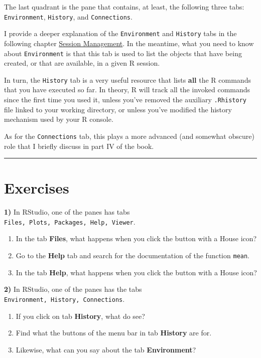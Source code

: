 \documentclass[
]{book}
\providecommand{\tightlist}{%
  \setlength{\itemsep}{0pt}\setlength{\parskip}{0pt}}
\begin{document}
The last quadrant is the pane that contains, at least, the following three
tabs: \texttt{Environment}, \texttt{History}, and \texttt{Connections}.

I provide a deeper explanation of the \texttt{Environment} and \texttt{History} tabs in the
following chapter \protect\hyperlink{session}{Session Management}. In the meantime, what you
need to know about \texttt{Environment} is that this tab is used to list the objects
that have being created, or that are available, in a given R session.

In turn, the \texttt{History} tab is a very useful resource that lists \textbf{all} the R
commands that you have executed so far. In theory, R will track all the invoked
commands since the first time you used it, unless you've removed the auxiliary
\texttt{.Rhistory} file linked to your working directory, or unless you've modified
the history mechanism used by your R console.

As for the \texttt{Connections} tab, this plays a more advanced (and somewhat obscure)
role that I briefly discuss in part IV of the book.

\begin{center}\rule{0.5\linewidth}{0.5pt}\end{center}

\hypertarget{exercises-1}{%
\section{Exercises}\label{exercises-1}}

\textbf{1)} In RStudio, one of the panes has tabs \texttt{Files,\ Plots,\ Packages,\ Help,\ Viewer}.

\begin{enumerate}
\def\labelenumi{\alph{enumi})}
\tightlist
\item
  In the tab \textbf{Files}, what happens when you click the button with a House icon?
\item
  Go to the \textbf{Help} tab and search for the documentation of the function \texttt{mean}.
\item
  In the tab \textbf{Help}, what happens when you click the button with a House icon?
\end{enumerate}

\textbf{2)} In RStudio, one of the panes has the tabs \texttt{Environment,\ History,\ Connections}.

\begin{enumerate}
\def\labelenumi{\alph{enumi})}
\tightlist
\item
  If you click on tab \textbf{History}, what do see?
\item
  Find what the buttons of the menu bar in tab \textbf{History} are for.
\item
  Likewise, what can you say about the tab \textbf{Environment}?
\end{enumerate}
\end{document}
